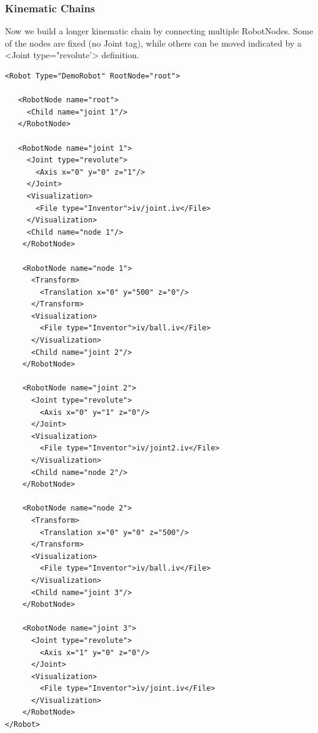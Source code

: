 \subsubsection{Kinematic Chains}
\par
Now we build a longer kinematic chain by connecting multiple RobotNodes. Some of the nodes are fixed (no Joint tag), while others can be moved indicated by a <Joint type="revolute'> definition. 
\par
\begin{lstlisting}
<Robot Type="DemoRobot" RootNode="root">

   <RobotNode name="root">
     <Child name="joint 1"/>
   </RobotNode>

   <RobotNode name="joint 1">
     <Joint type="revolute">
       <Axis x="0" y="0" z="1"/>
     </Joint>
     <Visualization>
       <File type="Inventor">iv/joint.iv</File>
     </Visualization>
     <Child name="node 1"/>
    </RobotNode>

    <RobotNode name="node 1">
      <Transform>
        <Translation x="0" y="500" z="0"/>
      </Transform>
      <Visualization>
        <File type="Inventor">iv/ball.iv</File>
      </Visualization>
      <Child name="joint 2"/>
    </RobotNode>

    <RobotNode name="joint 2">
      <Joint type="revolute">
        <Axis x="0" y="1" z="0"/>
      </Joint>
      <Visualization>
        <File type="Inventor">iv/joint2.iv</File>
      </Visualization>
      <Child name="node 2"/>
    </RobotNode>

    <RobotNode name="node 2">
      <Transform>
        <Translation x="0" y="0" z="500"/>
      </Transform>
      <Visualization>
        <File type="Inventor">iv/ball.iv</File>
      </Visualization>
      <Child name="joint 3"/>
    </RobotNode>

    <RobotNode name="joint 3">
      <Joint type="revolute">
        <Axis x="1" y="0" z="0"/>
      </Joint>
      <Visualization>
        <File type="Inventor">iv/joint.iv</File>
      </Visualization>
    </RobotNode> 
</Robot>
\end{lstlisting}
\par
